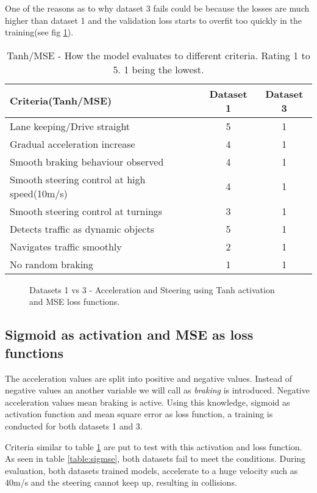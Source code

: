 One of the reasons as to why dataset 3 fails could be because the losses are much higher
than dataset 1 and the validation loss starts to overfit too quickly in the training(see
fig \ref{fig:ds1andd3tanhactivatonMSE}).
\begin{table}[!ht]
    \centering
\begin{tabular}{lcc}
    \toprule
    Criteria(Tanh/MSE)& Dataset 1 & Dataset 3 \\\midrule
    Lane keeping/Drive straight  & 5 & 1  \\
    Gradual acceleration increase & 4 & 1\\
    Smooth braking behaviour observed & 4 & 1 \\
    Smooth steering control at high speed(10m/s) & 4 & 1 \\
    Smooth steering control at turnings & 3 & 1\\
    Detects traffic as dynamic objects & 5 & 1\\
    Navigates traffic smoothly & 2 & 1\\
    No random braking & 1 & 1 \\\bottomrule
\end{tabular}
\caption{Tanh/MSE - How the model evaluates to different criteria. Rating 1 to 5. 1 being the lowest.}
\label{table:tanhmse}
\end{table}
\begin{figure}[!ht]
	\centering
    \def\svgwidth{\textwidth}
    \caption{Datasets 1 vs 3 - Acceleration and Steering using Tanh activation and MSE loss
    functions.}
    \label{fig:ds1andd3tanhactivatonMSE}
\end{figure}

\subsection{Sigmoid as activation and MSE as loss functions}
The acceleration values are split into positive and negative values. Instead of negative
values an another variable we will call as \textit{braking} is introduced. Negative
acceleration values mean braking is active. Using this knowledge, sigmoid as activation function and mean
square error as loss function, a training is conducted for both datasets 1 and 3.

Criteria similar to table \ref{table:tanhmse} are put to test with this activation and
loss function. As seen in table \ref{table:sigmse}, both datasets fail to meet the
conditions. During evaluation, both datasets trained models, accelerate to a huge velocity
such as 40m/s and the steering cannot keep up, resulting in collisions.

